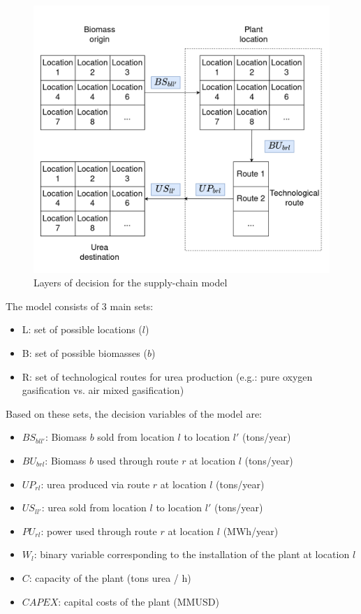 \documentclass[a4paper, titlepage]{article}
\begin{document}
\begin{figure}
	\includegraphics[width=\textwidth]{img/layers_of_decision.png}
	\caption{Layers of decision for the supply-chain model}
	\label{img_layers}
\end{figure}

The model consists of 3 main sets:

\begin{itemize}
	\item L: set of possible locations ($l$)
	\item B: set of possible biomasses ($b$)
	\item R: set of technological routes for urea production (e.g.: pure oxygen gasification vs. air mixed gasification)
\end{itemize}

Based on these sets, the decision variables of the model are:

\begin{itemize}
	\item $BS_{bll'}$: Biomass $b$ sold from location $l$ to location $l'$ (tons/year)
	\item $BU_{brl}$: Biomass $b$ used through route $r$ at location $l$ (tons/year)
	\item $UP_{rl}$: urea produced via route $r$ at location $l$ (tons/year)
	\item $US_{ll'}$: urea sold from location $l$ to location $l'$ (tons/year)
	\item $PU_{rl}$: power used through route $r$ at location $l$ (MWh/year)
	\item $W_l$: binary variable corresponding to the installation of the plant at location $l$
	\item $C$: capacity of the plant (tons urea / h)
	\item $CAPEX$: capital costs of the plant (MMUSD)
\end{itemize}
\end{document}
